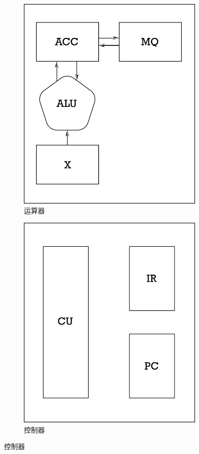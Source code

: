 \begin{figure}[H]
\centering
\begin{subfigure}{.48\textwidth}
\centering
\includegraphics[scale=.5]{img/figure19.pdf}
\caption{运算器}
\end{subfigure}
\begin{subfigure}{.48\textwidth}
\centering
\includegraphics[scale=.5]{img/figure20.pdf}
\caption{控制器}
\end{subfigure}
\end{figure}
